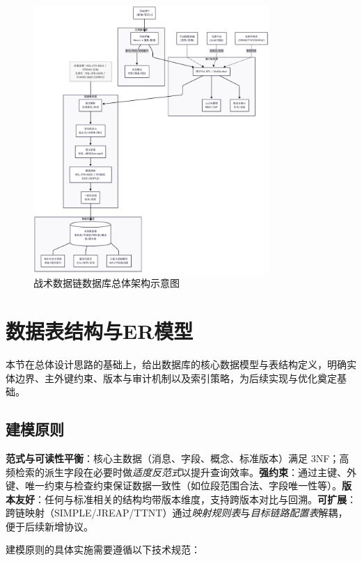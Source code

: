 \begin{figure}[H]
    \centering
    \includegraphics[width=0.8\textwidth,height=0.33\textheight,keepaspectratio]{chapters/fig-0/db-overall.png}
    \caption{战术数据链数据库总体架构示意图}
    \label{fig_db_overall}
\end{figure}

\section{数据表结构与ER模型}

本节在总体设计思路的基础上，给出数据库的核心数据模型与表结构定义，明确实体边界、主外键约束、版本与审计机制以及索引策略，为后续实现与优化奠定基础。

\subsection{建模原则}
\textbf{范式与可读性平衡}：核心主数据（消息、字段、概念、标准版本）满足 3NF；高频检索的派生字段在必要时做\emph{适度反范式}以提升查询效率。\textbf{强约束}：通过主键、外键、唯一约束与检查约束保证数据一致性（如位段范围合法、字段唯一性等）。\textbf{版本友好}：任何与标准相关的结构均带版本维度，支持跨版本对比与回溯。\textbf{可扩展}：跨链映射（SIMPLE/JREAP/TTNT）通过\emph{映射规则表}与\emph{目标链路配置表}解耦，便于后续新增协议。

建模原则的具体实施需要遵循以下技术规范：

